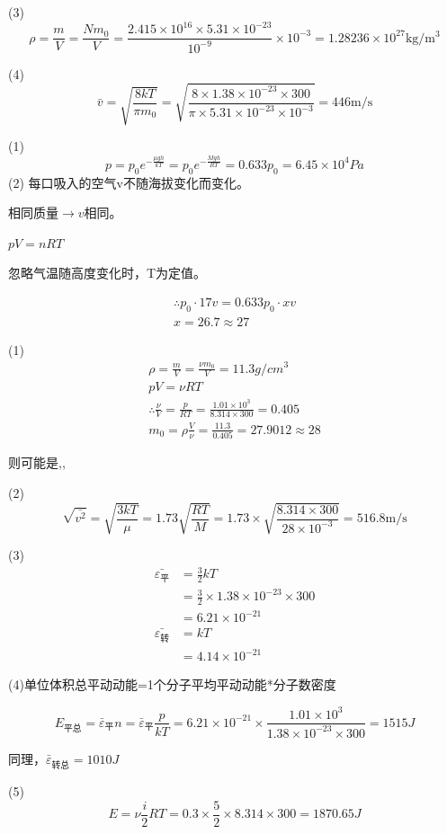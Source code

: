 (3)
$$
\rho = \frac { m } { V } = \frac { N m _ { 0 } } { V } = \frac { 2.415 \times 10 ^ { 16 } \times 5.31 \times 10 ^ { - 23 } } { 10 ^ { - 9 } } \times 10 ^ { - 3 } = 1.28236 \times 10 ^ { 27 } \mathrm { kg } / \mathrm { m } ^ { 3 }
$$

(4)
$$
\bar { v } = \sqrt { \frac { 8 k T } { \pi m _ { 0 } } } = \sqrt { \frac { 8 \times 1.38 \times 10 ^ { - 23 } \times 300 } { \pi \times 5.31 \times 10 ^ { - 23 } \times 10 ^ { - 3 } } } = 446 \mathrm { m } / \mathrm { s }
$$


\solve
(1)
$$
p = p _ { 0 } e ^ { - \frac { \mu g h } { k T } } = p _ { 0 } e ^ { - \frac { M g h } { R T } } = 0.633 p _ { 0 } = 6.45 \times 10 ^ { 4 } P a
$$
(2)
每口吸入的空气v不随海拔变化而变化。

相同质量$\rightarrow v $相同。

$pV=nRT$

忽略气温随高度变化时，T为定值。

$$
\begin{array}{l}
\therefore p_{0}\cdot 17 v =0.633p_0 \cdot x v\\
{ x = 26.7 \approx 27} 
\end{array}
$$

\solve
(1)
$$
\begin{array} { c } { \rho = \frac { m } { V } = \frac { \nu m _ { 0 } } { V } = 11.3 g / c m ^ { 3 } } \\ { p V = \nu R T } \\ { \therefore \frac { \nu } { V } = \frac { p } { R T } = \frac { 1.01 \times 10 ^ { 3 } } { 8.314 \times 300 } = 0.405 } \\ { m _ { 0 } = \rho \frac { V } { \nu } = \frac { 11.3 } { 0.405 } = 27.9012 \approx 28 } \end{array}
$$

则可能是,,

(2)
$$
\sqrt{\bar{v^{2}}}=\sqrt {\frac{3kT}{\mu}}=1.73\sqrt {\frac{RT}{M}}=1.73\times\sqrt{\frac{8.314\times 300}{28\times10^{-3}}}=516.8\mathrm{m}/\mathrm{s}
$$

(3)
\begin{align*}
\bar{\varepsilon_{\mbox{平}}}&=\frac{3}{2}kT\\
&=\frac{3}{2}\times 1.38\times 10^{-23}\times 300\\
&=6.21\times 10^{-21}\\
\bar{\varepsilon_{\mbox{转}}}&=kT\\
&=4.14\times 10^{-21}
\end{align*}

(4)单位体积总平动动能=1个分子平均平动动能*分子数密度

$$E_{\mbox{平总}}=\bar { \varepsilon } _ {\mbox{平}}n=\bar { \varepsilon } _ {\mbox{平}}\frac{p}{kT}=6.21 \times 10 ^ { - 21 } \times \frac { 1.01 \times 10 ^ { 3 } } { 1.38 \times 10 ^ { - 23 } \times 300 } = 1515 J$$

同理，$\bar { \varepsilon } _ {\mbox{转总}}=1010J$

(5)
$$
E = \nu \frac { i } { 2 } R T = 0.3 \times \frac { 5 } { 2 } \times 8.314 \times 300 = 1870.65 J
$$